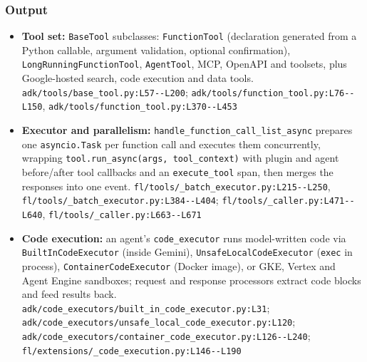 \subsubsection*{Output}
\begin{itemize}
\item \textbf{Tool set:} \texttt{BaseTool} subclasses: \texttt{FunctionTool} (declaration generated from a Python callable, argument validation, optional confirmation), \texttt{LongRunningFunctionTool}, \texttt{AgentTool}, MCP, OpenAPI and toolsets, plus Google-hosted search, code execution and data tools. \texttt{adk/\allowbreak{}tools/\allowbreak{}base\_\allowbreak{}tool.\allowbreak{}py:\allowbreak{}L57-\allowbreak{}-\allowbreak{}L200}; \texttt{adk/\allowbreak{}tools/\allowbreak{}function\_\allowbreak{}tool.\allowbreak{}py:\allowbreak{}L76-\allowbreak{}-\allowbreak{}L150}, \texttt{adk/\allowbreak{}tools/\allowbreak{}function\_\allowbreak{}tool.\allowbreak{}py:\allowbreak{}L370-\allowbreak{}-\allowbreak{}L453}
\item \textbf{Executor and parallelism:} \texttt{handle\_\allowbreak{}function\_\allowbreak{}call\_\allowbreak{}list\_\allowbreak{}async} prepares one \texttt{asyncio.\allowbreak{}Task} per function call and executes them concurrently, wrapping \texttt{tool.\allowbreak{}run\_\allowbreak{}async(\allowbreak{}args, tool\_\allowbreak{}context)} with plugin and agent before/after tool callbacks and an \texttt{execute\_\allowbreak{}tool} span, then merges the responses into one event. \texttt{fl/\allowbreak{}tools/\allowbreak{}\_\allowbreak{}batch\_\allowbreak{}executor.\allowbreak{}py:\allowbreak{}L215-\allowbreak{}-\allowbreak{}L250}, \texttt{fl/\allowbreak{}tools/\allowbreak{}\_\allowbreak{}batch\_\allowbreak{}executor.\allowbreak{}py:\allowbreak{}L384-\allowbreak{}-\allowbreak{}L404}; \texttt{fl/\allowbreak{}tools/\allowbreak{}\_\allowbreak{}caller.\allowbreak{}py:\allowbreak{}L471-\allowbreak{}-\allowbreak{}L640}, \texttt{fl/\allowbreak{}tools/\allowbreak{}\_\allowbreak{}caller.\allowbreak{}py:\allowbreak{}L663-\allowbreak{}-\allowbreak{}L671}
\item \textbf{Code execution:} an agent's \texttt{code\_\allowbreak{}executor} runs model-written code via \texttt{BuiltInCodeExecutor} (inside Gemini), \texttt{UnsafeLocalCodeExecutor} (\texttt{exec} in process), \texttt{ContainerCodeExecutor} (Docker image), or GKE, Vertex and Agent Engine sandboxes; request and response processors extract code blocks and feed results back. \texttt{adk/\allowbreak{}code\_\allowbreak{}executors/\allowbreak{}built\_\allowbreak{}in\_\allowbreak{}code\_\allowbreak{}executor.\allowbreak{}py:\allowbreak{}L31}; \texttt{adk/\allowbreak{}code\_\allowbreak{}executors/\allowbreak{}unsafe\_\allowbreak{}local\_\allowbreak{}code\_\allowbreak{}executor.\allowbreak{}py:\allowbreak{}L120}; \texttt{adk/\allowbreak{}code\_\allowbreak{}executors/\allowbreak{}container\_\allowbreak{}code\_\allowbreak{}executor.\allowbreak{}py:\allowbreak{}L126-\allowbreak{}-\allowbreak{}L240}; \texttt{fl/\allowbreak{}extensions/\allowbreak{}\_\allowbreak{}code\_\allowbreak{}execution.\allowbreak{}py:\allowbreak{}L146-\allowbreak{}-\allowbreak{}L190}

\end{itemize}
